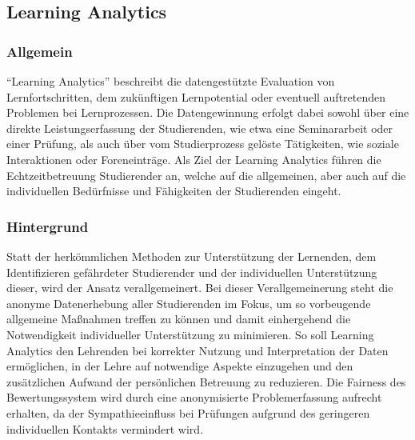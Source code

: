 \subsection{Learning Analytics}

\subsubsection{Allgemein}
\enquote{Learning Analytics} beschreibt die datengestützte Evaluation von Lernfortschritten, dem zukünftigen Lernpotential oder eventuell auftretenden Problemen bei Lernprozessen.
Die Datengewinnung erfolgt dabei sowohl über eine direkte Leistungserfassung der Studierenden, wie etwa eine Seminararbeit oder einer Prüfung, als auch über vom Studierprozess gelöste Tätigkeiten, wie soziale Interaktionen oder Foreneinträge.
Als Ziel der Learning Analytics führen \citeauthor{rf-Johnson2012TheNH} die Echtzeitbetreuung Studierender an, welche auf die allgemeinen, aber auch auf die individuellen Bedürfnisse und Fähigkeiten der Studierenden eingeht.
\autocite{rf-Johnson2012TheNH}

\subsubsection{Hintergrund}
Statt der herkömmlichen Methoden zur Unterstützung der Lernenden, dem Identifizieren gefährdeter Studierender und der individuellen Unterstützung dieser, wird der Ansatz verallgemeinert.
Bei dieser Verallgemeinerung steht die anonyme Datenerhebung aller Studierenden im Fokus, um so vorbeugende allgemeine Maßnahmen treffen zu können und damit einhergehend die Notwendigkeit individueller Unterstützung zu minimieren.
So soll Learning Analytics den Lehrenden bei korrekter Nutzung und Interpretation der Daten ermöglichen, in der Lehre auf notwendige Aspekte einzugehen und den zusätzlichen Aufwand der persönlichen Betreuung zu reduzieren.
Die Fairness des Bewertungssystem wird durch eine anonymisierte Problemerfassung aufrecht erhalten, da der Sympathieeinfluss bei Prüfungen aufgrund des geringeren individuellen Kontakts vermindert wird. 

